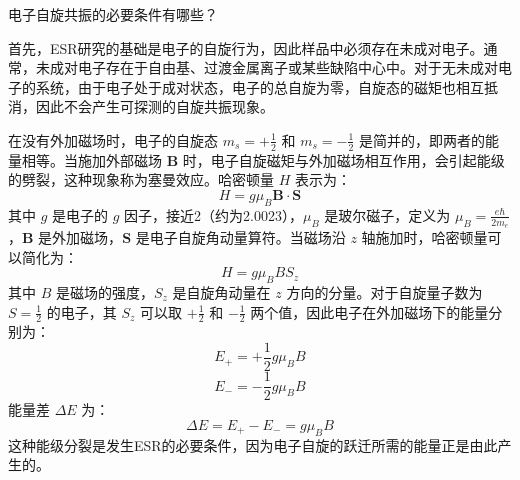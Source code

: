 \documentclass[dvipsnames, svgnames,a4paper,11pt]{article}
\begin{document}
\begin{question}
	电子自旋共振的必要条件有哪些？
\end{question}




首先，ESR研究的基础是电子的自旋行为，因此样品中必须存在未成对电子。通常，未成对电子存在于自由基、过渡金属离子或某些缺陷中心中。对于无未成对电子的系统，由于电子处于成对状态，电子的总自旋为零，自旋态的磁矩也相互抵消，因此不会产生可探测的自旋共振现象。

在没有外加磁场时，电子的自旋态 \( m_s = +\frac{1}{2} \) 和 \( m_s = -\frac{1}{2} \) 是简并的，即两者的能量相等。当施加外部磁场 \( \mathbf{B} \) 时，电子自旋磁矩与外加磁场相互作用，会引起能级的劈裂，这种现象称为塞曼效应。哈密顿量 \( H \) 表示为：\[ H = g \mu_B \mathbf{B} \cdot \mathbf{S} \]其中 \( g \) 是电子的 \( g \) 因子，接近2（约为2.0023），\( \mu_B \) 是玻尔磁子，定义为 \( \mu_B = \frac{e \hbar}{2m_e} \)，\( \mathbf{B} \) 是外加磁场，\( \mathbf{S} \) 是电子自旋角动量算符。当磁场沿 \( z \) 轴施加时，哈密顿量可以简化为：\[ H = g \mu_B B S_z \]其中 \( B \) 是磁场的强度，\( S_z \) 是自旋角动量在 \( z \) 方向的分量。对于自旋量子数为 \( S = \frac{1}{2} \) 的电子，其 \( S_z \) 可以取 \( +\frac{1}{2} \) 和 \( -\frac{1}{2} \) 两个值，因此电子在外加磁场下的能量分别为：\[ E_{+} = +\frac{1}{2} g \mu_B B \] \[ E_{-} = -\frac{1}{2} g \mu_B B \]能量差 \( \Delta E \) 为：\[ \Delta E = E_{+} - E_{-} = g \mu_B B \]这种能级分裂是发生ESR的必要条件，因为电子自旋的跃迁所需的能量正是由此产生的。
\end{document}
